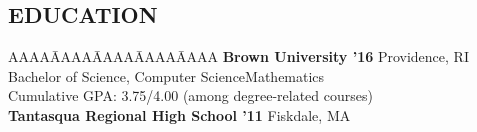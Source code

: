 \documentclass{res}
\begin{document}
\begin{resume}
\myvspace
\section{EDUCATION}     
\myvspace
\begin{tabbing}
AAAA\=AAAA\=AAAA\=AAAA\=AAAA\kill
{\bf Brown University '16} Providence, RI\\
	\>Bachelor of Science, Computer Science\textemdash Mathematics\\
	\>Cumulative GPA: 3.75/4.00 (among degree-related courses)\\
\sbreak
{\bf Tantasqua Regional High School '11} Fiskdale, MA\\%
\end{tabbing}
\sectionVspace %

\end{resume}
\end{document}

